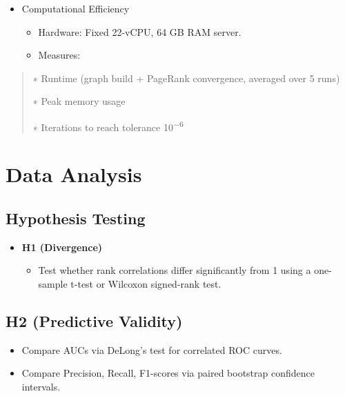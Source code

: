 \documentclass[
]{article}
\begin{document}
\begin{itemize}
  \begin{itemize}
  \item
    Compute Spearman's \emph{ρ} and Kendall's \emph{τ} between EndorseRank and AWP.
  \item
    Visualize via scatter plots and top-k Jaccard overlap.
  \end{itemize}
\item
  Computational Efficiency

  \begin{itemize}
  \item
    Hardware: Fixed 22-vCPU, 64 GB RAM server.
  \item
    Measures:
  \end{itemize}
\end{itemize}

\begin{quote}
∗ Runtime (graph build + PageRank convergence, averaged over 5 runs)

∗ Peak memory usage

∗ Iterations to reach tolerance 10\textsuperscript{−6}
\end{quote}

\section{Data Analysis}\label{data-analysis}

\subsection{Hypothesis Testing}\label{hypothesis-testing}

\begin{itemize}
\item
  \textbf{H1 (Divergence)}

  \begin{itemize}
  \item
    Test whether rank correlations differ significantly from 1 using a one- sample t-test or Wilcoxon signed-rank test.
  \end{itemize}
\end{itemize}

\subsection{H2 (Predictive Validity)}\label{h2-predictive-validity}

\begin{itemize}
\item
  Compare AUCs via DeLong's test for correlated ROC curves.
\item
  Compare Precision, Recall, F1-scores via paired bootstrap confidence intervals.
\end{itemize}
\end{document}
